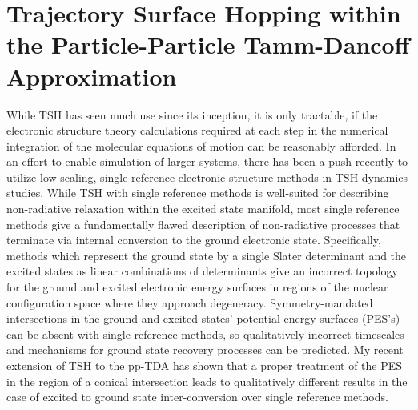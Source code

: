 \linespread{1.0}
\section{Trajectory Surface Hopping within the Particle-Particle Tamm-Dancoff Approximation}
\linespread{1.5}
\label{sec:pp-TSH}

While TSH has seen much use since its inception, it is only tractable, if the
electronic structure theory calculations required at each step in the numerical
integration of the molecular equations of motion  can be reasonably afforded.  In an
effort to enable simulation of larger systems, there has been a push recently to
utilize low-scaling, single reference electronic structure methods in TSH
dynamics studies.\cite{Lan15_1360,Rothlisberger07_023001,Li16_935} While TSH
with single reference  methods is well-suited for describing non-radiative
relaxation within the excited state
manifold\cite{Subotnik14_4253,Barbatti14_1395}, most single reference  methods
give a fundamentally flawed description of non-radiative processes that
terminate via internal conversion to the ground electronic state.  Specifically,
methods which represent the ground state by a single Slater determinant and the
excited states as linear combinations of determinants give an incorrect topology
for the ground and excited electronic energy surfaces in regions of the nuclear
configuration space where they approach degeneracy.\cite{Massimo14_3074,
Martinez06_1039} Symmetry-mandated intersections in the ground and excited
states' potential energy surfaces (PES's) can be absent with single reference
methods, so qualitatively incorrect timescales and mechanisms for ground state
recovery processes  can be predicted.  My recent extension of TSH to the pp-TDA
\cite{DBWY16_Submitted1} has shown that a proper treatment of the PES in the
region of a conical intersection leads to qualitatively different results in
the case of excited to ground state inter-conversion over single reference
methods.

